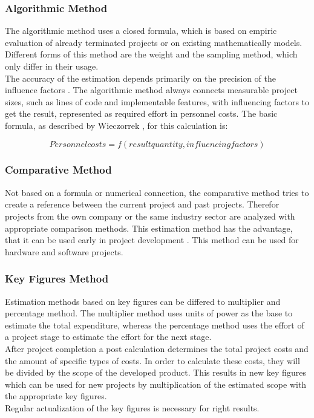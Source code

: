 \subsubsection{Algorithmic Method}

The algorithmic method uses a closed formula, which is based on empiric evaluation of already terminated projects or on existing mathematically models. Different forms of this method are the weight and the sampling method, which only differ in their usage.\\
The accuracy of the estimation depends primarily on the precision of the influence factors \cite{itplanung}. The algorithmic method always connects measurable project sizes, such as lines of code and implementable features, with influencing factors to get the result, represented as required effort in personnel costs. The basic formula, as described by Wieczorrek \cite{itplanung}, for this calculation is:

\begin{equation}
	Personnel costs = f(result quantity, influencing factors)
\end{equation}

\subsubsection{Comparative Method}

Not based on a formula or numerical connection, the comparative method tries to create a reference between the current project and past projects. Therefor projects from the own company or the same industry sector are analyzed with appropriate comparison methods. This estimation method has the advantage, that it can be used early in project development \cite{itplanung}. This method can be used for hardware and software projects.

\subsubsection{Key Figures Method}

Estimation methods based on key figures can be differed to multiplier and percentage  method. The multiplier method uses units of power as the base to estimate the total expenditure, whereas the percentage method uses the effort of a project stage to estimate the effort for the next stage.\\
After project completion a post calculation determines the total project costs and the amount of specific types of costs. In order to calculate these costs, they will be divided by the scope of the developed product. This results in new key figures which can be used for new projects by multiplication of the estimated scope with the appropriate key figures.\\
\cite{itplanung} Regular actualization of the key figures is necessary for right results.\\

